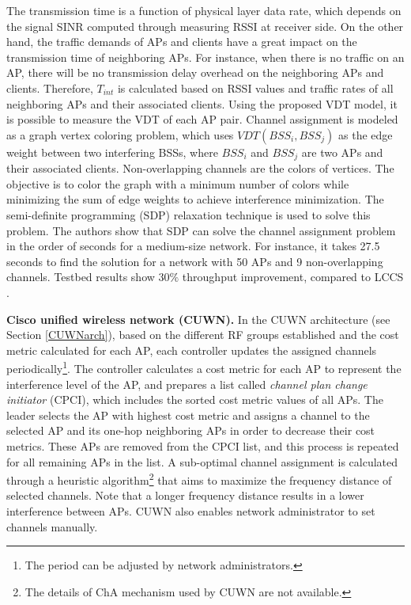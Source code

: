 The transmission time is a function of physical layer data rate, which depends on the signal SINR computed through measuring RSSI at receiver side.
On the other hand, the traffic demands of APs and clients have a great impact on the transmission time of neighboring APs. 
For instance, when there is no traffic on an AP, there will be no transmission delay overhead on the neighboring APs and clients. 
Therefore, $T_{int}$ is calculated based on RSSI values and traffic rates of all neighboring APs and their associated clients.
Using the proposed VDT model, it is possible to measure the VDT of each AP pair.
Channel assignment is modeled as a graph vertex coloring problem, which uses $VDT(BSS_i, BSS_j)$ as the edge weight between two interfering BSSs, where $BSS_i$ and $BSS_j$ are two APs and their associated clients.
Non-overlapping channels are the colors of vertices. 
The objective is to color the graph with a minimum number of colors while minimizing the sum of edge weights to achieve interference minimization. 
The semi-definite programming (SDP) \cite{SDP} relaxation technique is used to solve this problem.
The authors show that SDP  can solve the channel assignment problem in the order of seconds for a medium-size network. 
For instance, it takes 27.5 seconds to find the solution for a network with 50 APs and 9 non-overlapping channels. 
Testbed results show $30\%$ throughput improvement, compared to LCCS \cite{LCCS}. 

\textbf{Cisco unified wireless network (CUWN).}
\label{CUWN_CM}
In the CUWN architecture \cite{Cisco} (see Section \ref{CUWNarch}), based on the different RF groups established and the cost metric calculated for each AP, each controller updates the assigned channels periodically\footnote{The period can be adjusted by network administrators.}. 
The controller calculates a cost metric for each AP to represent the interference level of the AP, and prepares a list called \textit{channel plan change initiator} (CPCI), which includes the sorted cost metric values of all APs. 
The leader selects the AP with highest cost metric and assigns a channel to the selected AP and its one-hop neighboring APs in order to decrease their cost metrics. 
These APs are removed from the CPCI list, and this process is repeated for all remaining APs in the list.
A sub-optimal channel assignment is calculated through a heuristic algorithm\footnote{The details of ChA mechanism used by CUWN are not available.} that aims to maximize the frequency distance of selected channels. 
Note that a longer frequency distance results in a lower interference between APs. 
CUWN also enables network administrator to set channels manually.

